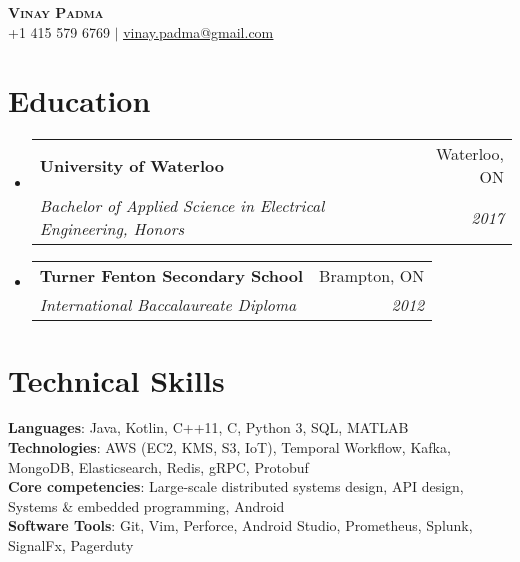 \documentclass[letterpaper,11pt]{article}
\makeatletter
\newcommand{\educationSubheading}[4]{
  \vspace{-2pt}\item
    \begin{tabular*}{0.97\textwidth}[t]{l@{\extracolsep{\fill}}r}
      \textbf{\large#1} & #2 \\
      \textit{\small#3} & \textit{\small #4} \\
    \end{tabular*}\vspace{-7pt}
}
\newcommand{\resumeSubHeadingListStart}{\begin{itemize}[leftmargin=0.15in, label={}]}
\newcommand{\resumeSubHeadingListEnd}{\end{itemize}}
\makeatother
\begin{document}
\begin{center}
    \textbf{\Huge \scshape Vinay Padma} \\ \vspace{1pt}
    \small +1 415 579 6769 $|$ \href{mailto:vinay.padma@gmail.com}{\underline{vinay.padma@gmail.com}}
\end{center}

\section{Education}
  \resumeSubHeadingListStart
    \educationSubheading
      {University of Waterloo}{Waterloo, ON}
      {Bachelor of Applied Science in Electrical Engineering, Honors}{2017}
    \educationSubheading
      {Turner Fenton Secondary School}{Brampton, ON}
      {International Baccalaureate Diploma}{2012}
  \resumeSubHeadingListEnd

\section{Technical Skills}
 \begin{itemize}[leftmargin=0.15in, label={}]
    \small{\item{
     \textbf{Languages}{: Java, Kotlin, C++11, C, Python 3, SQL, MATLAB} \\
     \textbf{Technologies}{: AWS (EC2, KMS, S3, IoT), Temporal Workflow, Kafka, MongoDB, Elasticsearch, Redis, gRPC, Protobuf} \\
     \textbf{Core competencies}{: Large-scale distributed systems design, API design, Systems \& embedded programming, Android} \\
     \textbf{Software Tools}{: Git, Vim, Perforce, Android Studio, Prometheus, Splunk, SignalFx, Pagerduty}
    }}
 \end{itemize}

\end{document}

